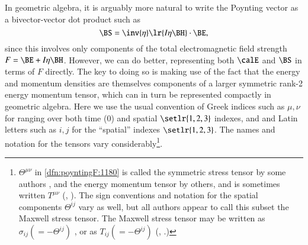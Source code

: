 In geometric algebra, it is arguably more natural to write the Poynting vector as a bivector-vector dot product such as
\begin{dmath}\label{eqn:poyntingF:1100}
\BS = \inv{\eta} \lr{ I \eta \BH } \cdot \BE,
\end{dmath}
since this involves only components of the total electromagnetic field strength \( F = \BE + I \eta \BH \).
However, we can do better, representing both \( \calE \) and \( \BS \) in terms of \( F \) directly.  The key to doing so is making use of the fact that
the energy and momentum densities are themselves components of a larger symmetric rank-2 energy momentum tensor, which can in turn be represented
compactly in geometric algebra.
\index{\(\Theta^{\mu\nu}\)}
\index{\(\lrT\)}
Here we use the usual convention of Greek indices such as \( \mu,\nu \) for ranging over both time (0) and spatial \( \setlr{1,2,3} \) indexes, and
and Latin letters such as \( i, j \)
for the ``spatial'' indexes
\( \setlr{1,2,3} \).
The names and notation for the tensors vary considerably\footnote{\( \Theta^{\mu\nu} \) in
\cref{dfn:poyntingF:1180}
is called the symmetric
stress tensor by some authors \citep{jackson1975cew},
and the energy momentum tensor by others, and is sometimes written \( T^{\mu\nu} \) (\citep{landau1980classical}, \citep{doran2003gap}).
The sign conventions and notation for the spatial components \( \Theta^{ij} \) vary as well, but all authors appear to call this subset the Maxwell stress tensor.
The Maxwell stress tensor may be written as \( \sigma_{ij} (=-\Theta^{ij}) \) \citep{landau1980classical}, or as
\( T_{ij} (=-\Theta^{ij}) \)
(\citep{griffiths1999introduction}, \citep{jackson1975cew}.)
}.

